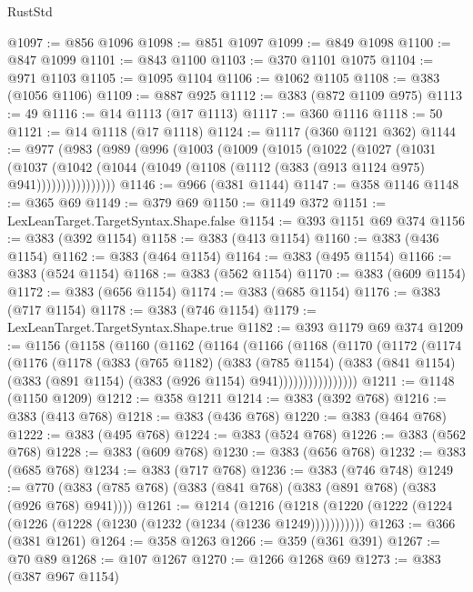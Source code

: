 \begin{lexlean}{RustStd}
\begin{coremodule}
{\begin{coremodule}
{{{{{{{{{{{{{{{{@1097 := @856 @1096
@1098 := @851 @1097
@1099 := @849 @1098
@1100 := @847 @1099
@1101 := @843 @1100
@1103 := @370 @1101 @1075
@1104 := @971 @1103
@1105 := @1095 @1104
@1106 := @1062 @1105
@1108 := @383 (@1056 @1106)
@1109 := @887 @925
@1112 := @383 (@872 @1109 @975)
@1113 := 49
@1116 := @14 @1113 (@17 @1113)
@1117 := @360 @1116
@1118 := 50
@1121 := @14 @1118 (@17 @1118)
@1124 := @1117 (@360 @1121 @362)
@1144 := @977
    (@983
      (@989
        (@996
          (@1003
            (@1009
              (@1015
                (@1022
                  (@1027
                    (@1031
                      (@1037
                        (@1042
                          (@1044 (@1049 (@1108 (@1112 (@383 (@913 @1124 @975) @941))))))))))))))))
@1146 := @966 (@381 @1144)
@1147 := @358 @1146
@1148 := @365 @69
@1149 := @379 @69
@1150 := @1149 @372
@1151 := LexLeanTarget.TargetSyntax.Shape.false
@1154 := @393 @1151 @69 @374
@1156 := @383 (@392 @1154)
@1158 := @383 (@413 @1154)
@1160 := @383 (@436 @1154)
@1162 := @383 (@464 @1154)
@1164 := @383 (@495 @1154)
@1166 := @383 (@524 @1154)
@1168 := @383 (@562 @1154)
@1170 := @383 (@609 @1154)
@1172 := @383 (@656 @1154)
@1174 := @383 (@685 @1154)
@1176 := @383 (@717 @1154)
@1178 := @383 (@746 @1154)
@1179 := LexLeanTarget.TargetSyntax.Shape.true
@1182 := @393 @1179 @69 @374
@1209 := @1156
    (@1158
      (@1160
        (@1162
          (@1164
            (@1166
              (@1168
                (@1170
                  (@1172
                    (@1174
                      (@1176
                        (@1178
                          (@383
                            (@765 @1182)
                            (@383
                              (@785 @1154)
                              (@383
                                (@841 @1154)
                                (@383 (@891 @1154) (@383 (@926 @1154) @941))))))))))))))))
@1211 := @1148 (@1150 @1209)
@1212 := @358 @1211
@1214 := @383 (@392 @768)
@1216 := @383 (@413 @768)
@1218 := @383 (@436 @768)
@1220 := @383 (@464 @768)
@1222 := @383 (@495 @768)
@1224 := @383 (@524 @768)
@1226 := @383 (@562 @768)
@1228 := @383 (@609 @768)
@1230 := @383 (@656 @768)
@1232 := @383 (@685 @768)
@1234 := @383 (@717 @768)
@1236 := @383 (@746 @748)
@1249 := @770 (@383 (@785 @768) (@383 (@841 @768) (@383 (@891 @768) (@383 (@926 @768) @941))))
@1261 := @1214
    (@1216 (@1218 (@1220 (@1222 (@1224 (@1226 (@1228 (@1230 (@1232 (@1234 (@1236 @1249)))))))))))
@1263 := @366 (@381 @1261)
@1264 := @358 @1263
@1266 := @359 (@361 @391)
@1267 := @70 @89
@1268 := @107 @1267
@1270 := @1266 @1268 @69
@1273 := @383 (@387 @967 @1154)
}}}}}}}}}}}}}}}}
\end{coremodule}}
\end{coremodule}
\end{lexlean}

